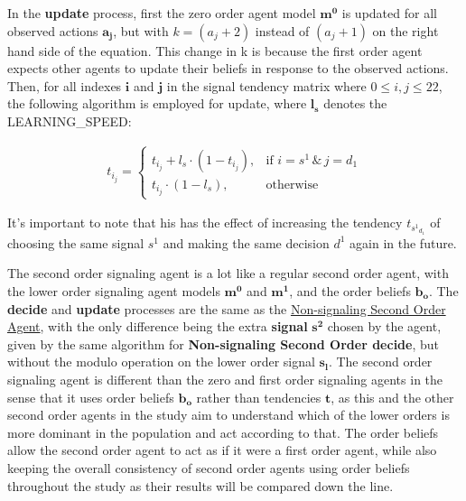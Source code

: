 In the \textbf{update} process, first the zero order agent model $\mathbf{m^0}$ is updated for all observed actions $\mathbf{a_j}$, but with $k = (a_j + 2)$ instead of $(a_j + 1)$ on the right hand side of the equation. This change in k is because the first order agent expects other agents to update their beliefs in response to the observed actions. Then, for all indexes $\mathbf{i}$ and $\mathbf{j}$ in the signal tendency matrix where $0 \leq i, j \leq 22$, the following algorithm is employed for update, where $\mathbf{l_s}$ denotes the LEARNING\_SPEED:

\begin{equation*}
\begin{aligned}
    t_{i_j} = \begin{cases}
        t_{i_j} + l_s \cdot (1 - t_{i_j}), & \text{{if }} i = s^1 \, \& \, j = d_1 \\
        t_{i_j} \cdot (1 - l_s), & \text{{otherwise}}
    \end{cases}
\end{aligned}
\end{equation*}

It's important to note that his has the effect of increasing the tendency $t_{{s^1}_{d_1}}$ of choosing the same signal $s^1$ and making the same decision $d^1$ again in the future.


The second order signaling agent is a lot like a regular second order agent, with the lower order signaling agent models $\mathbf{m^0}$ and $\mathbf{m^1}$, and the order beliefs $\mathbf{b_o}$. The \textbf{decide} and \textbf{update} processes are the same as the \hyperref[eq:second-order-decide]{Non-signaling Second Order Agent}, with the only difference being the extra \textbf{signal} $\mathbf{s^2}$ chosen by the agent, given by the same algorithm for \textbf{Non-signaling Second Order decide}, but without the modulo operation on the lower order signal $\mathbf{s_l}$. The second order signaling agent is different than the zero and first order signaling agents in the sense that it uses order beliefs $\mathbf{b_o}$ rather than tendencies $\mathbf{t}$, as this and the other second order agents in the study aim to understand which of the lower orders is more dominant in the population and act according to that. The order beliefs allow the second order agent to act as if it were a first order agent, while also keeping the overall consistency of second order agents using order beliefs throughout the study as their results will be compared down the line.

